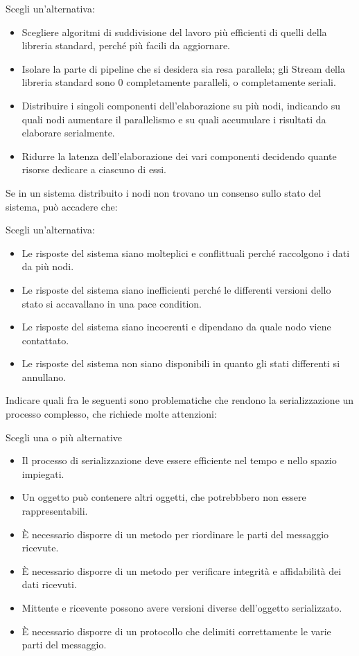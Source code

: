 \documentclass{article}
\begin{document}
Scegli un'alternativa: 
\begin{itemize}
	\item Scegliere algoritmi di suddivisione del lavoro più efficienti di quelli della libreria standard, perché più facili da aggiornare.
	\item Isolare la parte di pipeline che si desidera sia resa parallela; gli
		Stream della libreria standard sono 0 completamente paralleli, o
		completamente seriali. \checkmark
	\item Distribuire i singoli componenti dell'elaborazione su più nodi,
		indicando su quali nodi aumentare il parallelismo e su quali accumulare
		i risultati da elaborare serialmente.
	\item Ridurre la latenza dell'elaborazione dei vari componenti decidendo
		quante risorse dedicare a ciascuno di essi. 
\end{itemize}

Se in un sistema distribuito i nodi non trovano un consenso sullo stato del sistema, può accadere che:

Scegli un'alternativa: \begin{itemize}
	\item Le risposte del sistema siano molteplici e conflittuali perché raccolgono i dati da più nodi.
	\item Le risposte del sistema siano inefficienti perché le differenti versioni dello stato si accavallano in una pace condition.
	\item Le risposte del sistema siano incoerenti e dipendano da quale nodo viene contattato. \checkmark
	\item Le risposte del sistema non siano disponibili in quanto gli stati differenti si annullano.
\end{itemize}

Indicare quali fra le seguenti sono problematiche che rendono la serializzazione un processo complesso, che richiede molte attenzioni:

Scegli una o più alternative
\begin{itemize}
	\item \checkmark Il processo di serializzazione deve essere efficiente nel tempo e nello spazio impiegati.
	\item \checkmark Un oggetto può contenere altri oggetti, che potrebbbero non essere rappresentabili.
	\item È necessario disporre di un metodo per riordinare le parti del messaggio ricevute.
	\item \checkmark È necessario disporre di un metodo per verificare integrità e affidabilità dei dati ricevuti.
	\item \checkmark Mittente e ricevente possono avere versioni diverse dell'oggetto serializzato.
	\item È necessario disporre di un protocollo che delimiti correttamente le varie parti del messaggio.
\end{itemize}
\end{document}
